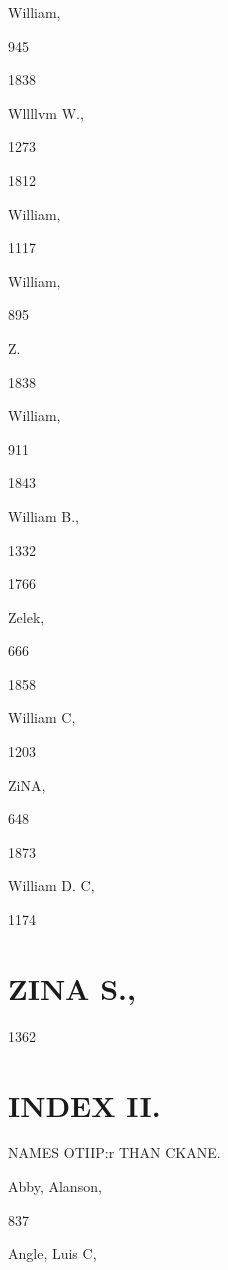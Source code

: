 \documentclass{book}
\begin{document}
{{{William, 


945 


1838 


Wllllvm W., 


1273 


1812 


William, 


1117 










William, 


895 




Z. 




1838 


William, 


911 








1843 


William B., 


1332 


1766 


Zelek, 


666 


1858 


William C, 


1203 




ZiNA, 


648 


1873 


William D. C, 


1174 




\chapter{ZINA S.,}

1362 



\chapter{INDEX II.}


NAMES OTIIP:r THAN CKANE. 



Abby, Alanson, 


837 


Angle, Luis C, 


}}}
\end{document}
